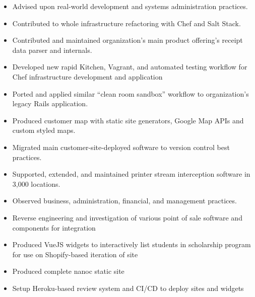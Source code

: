 \documentclass[10pt,letter,ragged2e]{altacv}
\begin{document}
\begin{paracol}{2}
\begin{itemize}
\item Advised upon real-world development and systems administration practices.
\item Contributed to whole infrastructure refactoring with Chef and Salt Stack.
\item Contributed and maintained organization's main product offering's receipt data parser and internals.
\item Developed new rapid Kitchen, Vagrant, and automated testing workflow for Chef infrastructure development and application
\item Ported and applied similar ``clean room sandbox'' workflow to organization's legacy Rails application.
\item Produced customer map with static site generators, Google Map APIs and custom styled maps. 
\item Migrated main customer-site-deployed software to version control best practices.
\item Supported, extended, and maintained printer stream interception software in 3,000 locations.
\item Observed business, administration, financial, and management practices.
\item Reverse engineering and investigation of various point of sale software and components for integration
\end{itemize}

\begin{itemize}
\item Produced VueJS widgets to interactively list students in scholarship program for use on Shopify-based iteration of site
\item Produced complete nanoc static site
\item Setup Heroku-based review system and CI/CD to deploy sites and widgets
\end{itemize}




\end{paracol}
\end{document}
